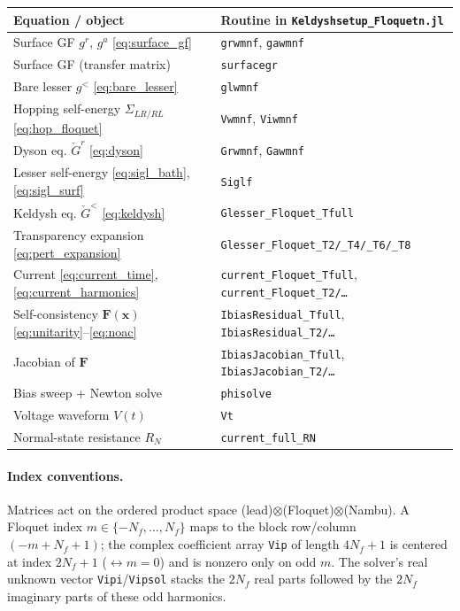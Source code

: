 \documentclass[11pt,a4paper]{article}
\newcommand{\Gr}{\check{G}}            %
\begin{document}
\begin{center}
\renewcommand{\arraystretch}{1.25}
\begin{tabular}{ll}
\hline
\textbf{Equation / object} & \textbf{Routine in \texttt{Keldyshsetup\_Floquetn.jl}}\\
\hline
Surface GF $g^r$, $g^a$ \eqref{eq:surface_gf} & \texttt{grwmnf}, \texttt{gawmnf}\\
Surface GF (transfer matrix) & \texttt{surfacegr}\\
Bare lesser $g^<$ \eqref{eq:bare_lesser} & \texttt{glwmnf}\\
Hopping self-energy $\Sigma_{LR/RL}$ \eqref{eq:hop_floquet} & \texttt{Vwmnf}, \texttt{Viwmnf}\\
Dyson eq. $\Gr^r$ \eqref{eq:dyson} & \texttt{Grwmnf}, \texttt{Gawmnf}\\
Lesser self-energy \eqref{eq:sigl_bath}, \eqref{eq:sigl_surf} & \texttt{Siglf}\\
Keldysh eq. $\Gr^<$ \eqref{eq:keldysh} & \texttt{Glesser\_Floquet\_Tfull}\\
Transparency expansion \eqref{eq:pert_expansion} & \texttt{Glesser\_Floquet\_T2/\_T4/\_T6/\_T8}\\
Current \eqref{eq:current_time}, \eqref{eq:current_harmonics} & \texttt{current\_Floquet\_Tfull}, \texttt{current\_Floquet\_T2/\ldots}\\
Self-consistency $\mathbf F(\mathbf x)$ \eqref{eq:unitarity}--\eqref{eq:noac} & \texttt{IbiasResidual\_Tfull}, \texttt{IbiasResidual\_T2/\ldots}\\
Jacobian of $\mathbf F$ & \texttt{IbiasJacobian\_Tfull}, \texttt{IbiasJacobian\_T2/\ldots}\\
Bias sweep + Newton solve & \texttt{phisolve}\\
Voltage waveform $V(t)$ & \texttt{Vt}\\
Normal-state resistance $R_N$ & \texttt{current\_full\_RN}\\
\hline
\end{tabular}
\end{center}

\paragraph{Index conventions.}
Matrices act on the ordered product space (lead)$\otimes$(Floquet)$\otimes$(Nambu).
A Floquet index $m\in\{-N_f,\dots,N_f\}$ maps to the block row/column
$(-m+N_f+1)$; the complex coefficient array \texttt{Vip} of length $4N_f+1$ is
centered at index $2N_f+1$ ($\leftrightarrow m=0$) and is nonzero only on odd
$m$.  The solver's real unknown vector \texttt{Vipi}/\texttt{Vipsol} stacks the
$2N_f$ real parts followed by the $2N_f$ imaginary parts of these odd
harmonics.
\end{document}
